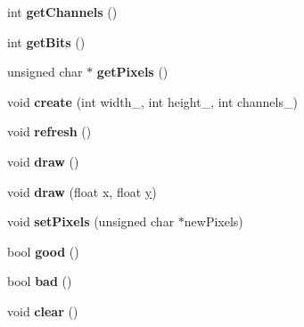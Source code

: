\begin{DoxyCompactItemize}
\item 
\hypertarget{class_image_a074132850b855562d55cd7246a993141}{int {\bfseries get\+Channels} ()}\label{class_image_a074132850b855562d55cd7246a993141}

\item 
\hypertarget{class_image_ac1ebc069f90eca38273287af08ec534f}{int {\bfseries get\+Bits} ()}\label{class_image_ac1ebc069f90eca38273287af08ec534f}

\item 
\hypertarget{class_image_a258eb6a4161c857bbc13375253ba6071}{unsigned char $\ast$ {\bfseries get\+Pixels} ()}\label{class_image_a258eb6a4161c857bbc13375253ba6071}

\item 
\hypertarget{class_image_a00a4adea36bd158a73bed36a3290b7da}{void {\bfseries create} (int width\+\_\+, int height\+\_\+, int channels\+\_\+)}\label{class_image_a00a4adea36bd158a73bed36a3290b7da}

\item 
\hypertarget{class_image_a1c96dd09cc7096721a4a0492caa2d127}{void {\bfseries refresh} ()}\label{class_image_a1c96dd09cc7096721a4a0492caa2d127}

\item 
\hypertarget{class_image_ae1e16dcef3072e4e49ec2887a9c1245a}{void {\bfseries draw} ()}\label{class_image_ae1e16dcef3072e4e49ec2887a9c1245a}

\item 
\hypertarget{class_image_abc3be0249ac820c45866ea7cd4250f03}{void {\bfseries draw} (float x, float \hyperlink{_ice_utils_8h_aa7ffaed69623192258fb8679569ff9ba}{y})}\label{class_image_abc3be0249ac820c45866ea7cd4250f03}

\item 
\hypertarget{class_image_abe24595a8568d420595c0df858dc8595}{void {\bfseries set\+Pixels} (unsigned char $\ast$new\+Pixels)}\label{class_image_abe24595a8568d420595c0df858dc8595}

\item 
\hypertarget{class_image_a48728c5c23505df992a61731a5e733c9}{bool {\bfseries good} ()}\label{class_image_a48728c5c23505df992a61731a5e733c9}

\item 
\hypertarget{class_image_a68eb3dab33d30bbba70e62e79c74c686}{bool {\bfseries bad} ()}\label{class_image_a68eb3dab33d30bbba70e62e79c74c686}

\item 
\hypertarget{class_image_a3a233515eb3a5f83917dc634c778db5a}{void {\bfseries clear} ()}\label{class_image_a3a233515eb3a5f83917dc634c778db5a}


\end{DoxyCompactItemize}
